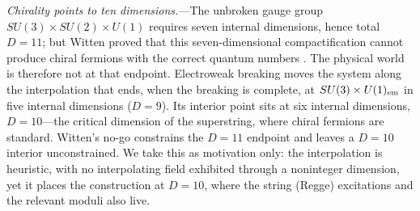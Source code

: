 \documentclass[aps,prl,reprint,superscriptaddress,nofootinbib]{revtex4-2}
\begin{document}
\textit{Chirality points to ten dimensions.}---The unbroken gauge group
$SU(3)\times SU(2)\times U(1)$ requires seven internal dimensions, hence total
$D=11$; but Witten proved that this seven-dimensional compactification cannot
produce chiral fermions with the correct quantum numbers \cite{WittenKK1981}. The
physical world is therefore not at that endpoint. Electroweak breaking moves the
system along the interpolation that ends, when the breaking is complete, at
$SU(3)\times U(1)_{\rm em}$ in five internal dimensions ($D=9$). Its interior
point sits at six internal dimensions, $D=10$---the critical dimension of the
superstring, where chiral fermions are standard. Witten's no-go constrains the
$D=11$ endpoint and leaves a $D=10$ interior unconstrained. We take this as
motivation only: the interpolation is heuristic, with no interpolating field
exhibited through a noninteger dimension, yet it places the construction at $D=10$, where
the string (Regge) excitations and the relevant moduli also live.
\end{document}
